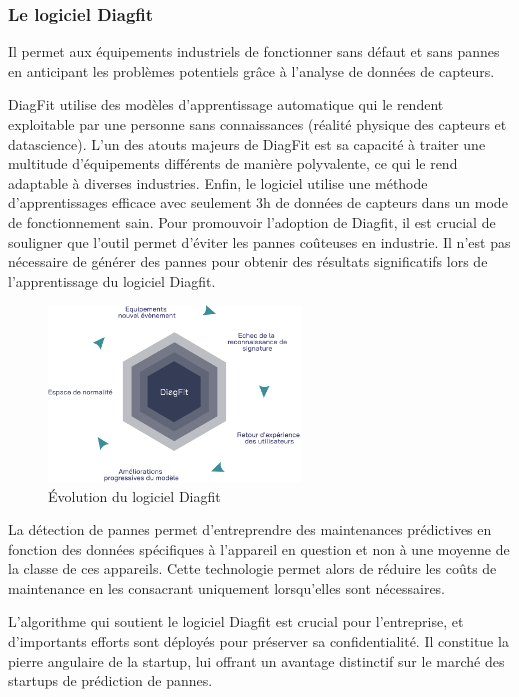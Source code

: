 \newpage

\subsubsection{Le logiciel Diagfit}
Il permet aux équipements industriels de fonctionner sans défaut et sans pannes en anticipant les problèmes potentiels grâce à l'analyse de données de capteurs.

DiagFit utilise des modèles d'apprentissage automatique qui le rendent exploitable par une personne sans connaissances (réalité physique des capteurs et datascience).
L'un des atouts majeurs de DiagFit est sa capacité à traiter une multitude d'équipements différents de manière polyvalente, ce qui le rend adaptable à diverses industries.
Enfin, le logiciel utilise une méthode d'apprentissages efficace avec seulement 3h de données de capteurs dans un mode de fonctionnement sain.
Pour promouvoir l'adoption de Diagfit, il est crucial de souligner que l'outil permet d'éviter les pannes coûteuses en industrie.
Il n'est pas nécessaire de générer des pannes pour obtenir des résultats significatifs lors de l'apprentissage du logiciel Diagfit.

\begin{figure}[ht!]
    \centering
    \includegraphics[width=0.6\textwidth]{paper/figures/diagfit.pdf}
    \caption{Évolution du logiciel Diagfit}
    \label{fig:diagfit}
\end{figure}

La détection de pannes permet d'entreprendre des maintenances prédictives en fonction des données spécifiques à l'appareil en question et non à une moyenne de la classe de ces appareils.
Cette technologie permet alors de réduire les coûts de maintenance en les consacrant uniquement lorsqu'elles sont nécessaires.

L'algorithme qui soutient le logiciel Diagfit est crucial pour l'entreprise, et d'importants efforts sont déployés pour préserver sa confidentialité.
Il constitue la pierre angulaire de la startup, lui offrant un avantage distinctif sur le marché des startups de prédiction de pannes.

